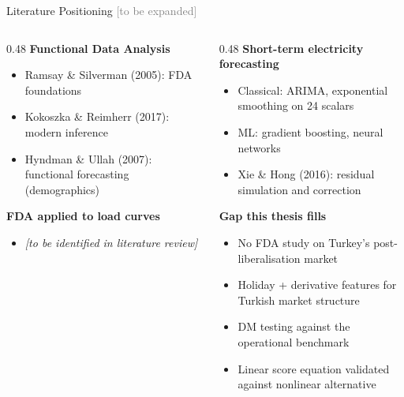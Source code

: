 \documentclass[10pt,aspectratio=169]{beamer}
\begin{document}
\begin{frame}{Literature Positioning \textcolor{gray}{\small [to be expanded]}}
  \begin{columns}
    \begin{column}{0.48\textwidth}
      \textbf{Functional Data Analysis}
      \begin{itemize}
        \item Ramsay \& Silverman (2005): FDA foundations
        \item Kokoszka \& Reimherr (2017): modern inference
        \item Hyndman \& Ullah (2007): functional forecasting (demographics)
      \end{itemize}
      \vspace{0.4em}
      \textbf{FDA applied to load curves}
      \begin{itemize}
        \item \textit{[to be identified in literature review]}
      \end{itemize}
    \end{column}
    \begin{column}{0.48\textwidth}
      \textbf{Short-term electricity forecasting}
      \begin{itemize}
        \item Classical: ARIMA, exponential smoothing on 24 scalars
        \item ML: gradient boosting, neural networks
        \item Xie \& Hong (2016): residual simulation and correction
      \end{itemize}
      \vspace{0.4em}
      \textbf{Gap this thesis fills}
      \begin{itemize}
        \item No FDA study on Turkey's post-liberalisation market
        \item Holiday + derivative features for Turkish market structure
        \item DM testing against the operational benchmark
        \item Linear score equation validated against nonlinear alternative
      \end{itemize}
    \end{column}
  \end{columns}
\end{frame}
\end{document}
